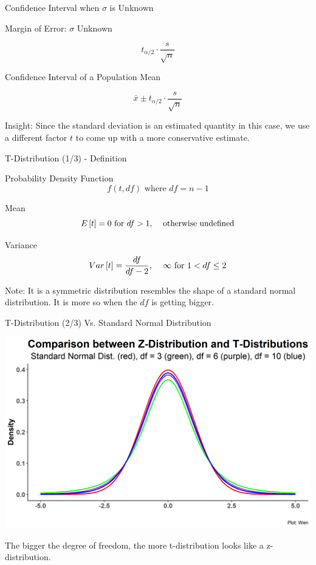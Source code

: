 \documentclass{beamer}
\begin{document}
\begin{frame}{Confidence Interval when $\sigma$ is Unknown}

Margin of Error: $\sigma$ Unknown 

$$ t_{\alpha/2}\cdot \frac{s}{\sqrt{n}} $$

Confidence Interval of a Population Mean

$$ \bar{x} \pm t_{\alpha/2}\cdot \frac{s}{\sqrt{n}} $$

Insight: Since the standard deviation is an estimated quantity in this case, we use a different factor $t$ to come up with a more conservative estimate.


\end{frame}






\begin{frame}{T-Distribution (1/3) - Definition}

Probability Density Function 
$$f(t, df) \text{ where } df = n-1$$

Mean 
$$E\left[ t \right]= 0 \text{  for  } df > 1 \text{, \quad otherwise undefined}$$

Variance 
$$ Var\left[ t \right] = \frac{df}{df - 2} \text{,  \quad} \infty \text{  for  } 1<df\leq 2$$

Note: It is a symmetric distribution resembles the shape of a standard normal distribution. It is more so when the $df$ is getting bigger.

\end{frame}



\begin{frame}{T-Distribution (2/3) Vs. Standard Normal Distribution}


\begin{center}
\includegraphics[scale=0.52]{images/normalandTdf-1.png}

\end{center}

The bigger the degree of freedom, the more t-distribution looks like a z-distribution. 

\end{frame}
\end{document}

